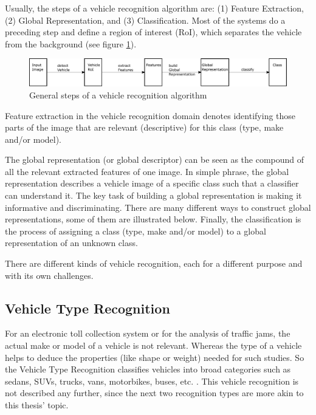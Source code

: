 Usually, the steps of a vehicle recognition algorithm are: (1) Feature Extraction, (2) Global Representation, and (3) Classification. Most of the systems do a preceding step and define a region of interest (RoI), which separates the vehicle from the background (see figure \ref{fig:vrSteps}).

\begin{figure}[bth]
  \centering
        \includegraphics[width=.95\linewidth]{gfx/vr_steps}
        \caption{General steps of a vehicle recognition algorithm}
        \label{fig:vrSteps}
\end{figure}

Feature extraction in the vehicle recognition domain denotes identifying those parts of the image that are relevant (descriptive) for this class (type, make and/or model).

The global representation (or global descriptor) can be seen as the compound of all the relevant extracted features of one image. In simple phrase, the global representation describes a vehicle image of a specific class such that a classifier can understand it. The key task of building a global representation is making it informative and discriminating. There are many different ways to construct global representations, some of them are illustrated below.
Finally, the classification is the process of assigning a class (type, make and/or model) to a global representation of an unknown class.

There are different kinds of vehicle recognition, each for a different purpose and with its own challenges.

\subsection{Vehicle Type Recognition}
For an electronic toll collection system or for the analysis of traffic jams, the actual make or model of a vehicle is not relevant. Whereas the type of a vehicle helps to deduce the properties (like shape or weight) needed for such studies. So the Vehicle Type Recognition classifies vehicles into broad categories such as sedans, SUVs, trucks, vans, motorbikes, buses, etc. \citep{siddiqui2015robust}. This vehicle recognition is not described any further, since the next two recognition types are more akin to this thesis' topic.

